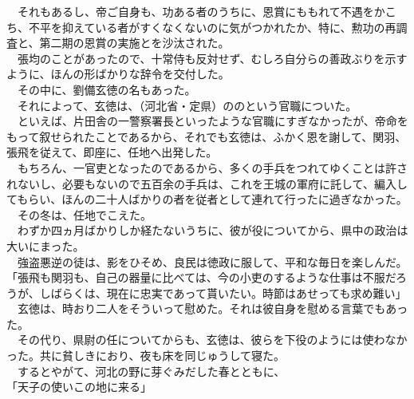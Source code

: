 \documentclass[
  paper=a5,
  fontsize=10pt,
  jafontsize=9.5pt,
  tate,                  %
  open_bracket_pos=nibu, %
]{jlreq}
\begin{document}
　それもあるし、帝ご自身も、功ある者のうちに、恩賞にももれて不遇をかこち、不平を抑えている者がすくなくないのに気がつかれたか、特に、勲功の再調査と、第二期の恩賞の実施とを沙汰された。\\


　張均のことがあったので、十常侍も反対せず、むしろ自分らの善政ぶりを示すように、ほんの形ばかりな辞令を交付した。\\


　その中に、劉備玄徳の名もあった。\\


　それによって、玄徳は、（河北省・定県）ののという官職についた。\\


　といえば、片田舎の一警察署長といったような官職にすぎなかったが、帝命をもって叙せられたことであるから、それでも玄徳は、ふかく恩を謝して、関羽、張飛を従えて、即座に、任地へ出発した。\\


　もちろん、一官吏となったのであるから、多くの手兵をつれてゆくことは許されないし、必要もないので五百余の手兵は、これを王城の軍府に託して、編入してもらい、ほんの二十人ばかりの者を従者として連れて行ったに過ぎなかった。\\


　その冬は、任地でこえた。\\


　わずか四ヵ月ばかりしか経たないうちに、彼が役についてから、県中の政治は大いにまった。\\


　強盗悪逆の徒は、影をひそめ、良民は徳政に服して、平和な毎日を楽しんだ。\\


「張飛も関羽も、自己の器量に比べては、今の小吏のするような仕事は不服だろうが、しばらくは、現在に忠実であって貰いたい。時節はあせっても求め難い」\\


　玄徳は、時おり二人をそういって慰めた。それは彼自身を慰める言葉でもあった。\\


　その代り、県尉の任についてからも、玄徳は、彼らを下役のようには使わなかった。共に貧しきにおり、夜も床を同じゅうして寝た。\\


　するとやがて、河北の野に芽ぐみだした春とともに、\\


「天子の使いこの地に来る」\\
\end{document}
